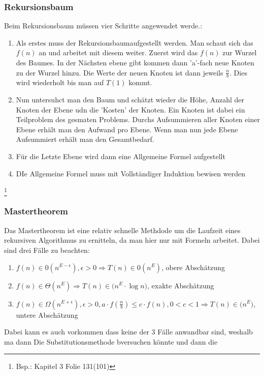 \documentclass[a4paper]{scrartcl}
\begin{document}
        \subsubsection*{Rekursionsbaum}
        Beim Rekursionsbaum müssen vier Schritte angewendet werde.:
        \begin{enumerate}
            \item Als erstes muss der Rekursionsbaumaufgestellt werden. Man schaut sich das \(f(n)\) an und arbeitet mit diesem weiter. Zuerst wird das \(f(n)\) zur Wurzel des Baumes.
                In der Nächsten ebene gibt kommen dann 'a'-fach neue Knoten zu der Wurzel hinzu. Die Werte der neuen Knoten ist dann jeweils \(\frac{n}{b}\). Dies wird wiederholt bis
                man auf \(T(1)\) kommt.
            \item Nun untersuhct man den Baum und schätzt wieder die Höhe, Anzahl der Knoten der Ebene udn die 'Kosten' der Knoten. Ein Knoten ist dabei ein Teilproblem des gesmaten Problems.
                Durchs Aufsummieren aller Knoten einer Ebene erhält man den Aufwand pro Ebene. Wenn man nun jede Ebene Aufsummiert erhält man den Gesamtbedarf. 
            \item Für die Letzte Ebene wird dann eine Allgemeine Formel aufgestellt
            \item DIe Allgemeine Formel muss mit Vollständiger Induktion bewisen werden
        \end{enumerate}\footnote{Bsp.: Kapitel 3 Folie 131(101)}

        \subsubsection*{Mastertheorem}
        Das Mastertheorem ist eine relativ schnelle Methdode um die Laufzeit eines rekursiven Algorithmus zu ernitteln, da man hier nur mit Formeln arbeitet. Dabei sind drei Fälle zu 
        beachten: 
        \begin{enumerate}
            \item \(f(n) \in \mathcal{0}(n^{E - \epsilon}), \epsilon > 0 \Rightarrow T(n) \in \mathcal{0}(n^E) \), obere Abschätzung
            \item \(f(n) \in \Theta(n^{E}) \Rightarrow T(n) \in \mathcal(n^E \cdot \log n) \), exakte Abschätzung
            \item \(f(n) \in \Omega(n^{E + \epsilon}), \epsilon > 0, a \cdot f(\frac{n}{b}) \le c \cdot f(n), 0 < c < 1 \Rightarrow T(n) \in \mathcal(n^E) \), untere Abschätzung
        \end{enumerate} 
        Dabei kann es auch vorkommen dass keine der 3 Fälle anwandbar sind, weshalb ma dann Die Substitutionsmethode bversuchen könnte und dann die 
    
\end{document}
